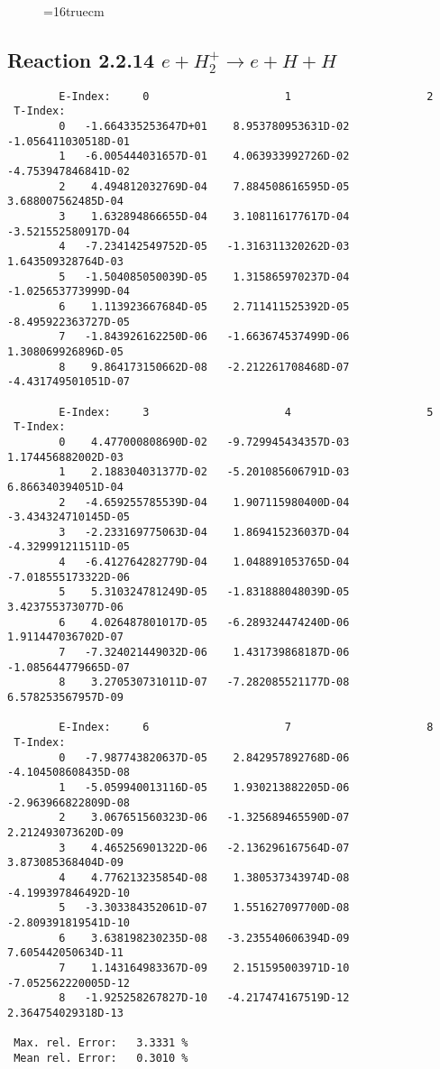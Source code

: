 \documentclass[12pt]{article}
\begin{document}
\begin{figure} \label{2.2.12}
\epsfxsize=16truecm
\end{figure}
\newpage



\subsection{
Reaction 2.2.14  $ e + H_2^+    \rightarrow e + H + H  $
}



\begin{small}\begin{verbatim}
        E-Index:     0                     1                     2
 T-Index:
        0   -1.664335253647D+01    8.953780953631D-02   -1.056411030518D-01
        1   -6.005444031657D-01    4.063933992726D-02   -4.753947846841D-02
        2    4.494812032769D-04    7.884508616595D-05    3.688007562485D-04
        3    1.632894866655D-04    3.108116177617D-04   -3.521552580917D-04
        4   -7.234142549752D-05   -1.316311320262D-03    1.643509328764D-03
        5   -1.504085050039D-05    1.315865970237D-04   -1.025653773999D-04
        6    1.113923667684D-05    2.711411525392D-05   -8.495922363727D-05
        7   -1.843926162250D-06   -1.663674537499D-06    1.308069926896D-05
        8    9.864173150662D-08   -2.212261708468D-07   -4.431749501051D-07

        E-Index:     3                     4                     5
 T-Index:
        0    4.477000808690D-02   -9.729945434357D-03    1.174456882002D-03
        1    2.188304031377D-02   -5.201085606791D-03    6.866340394051D-04
        2   -4.659255785539D-04    1.907115980400D-04   -3.434324710145D-05
        3   -2.233169775063D-04    1.869415236037D-04   -4.329991211511D-05
        4   -6.412764282779D-04    1.048891053765D-04   -7.018555173322D-06
        5    5.310324781249D-05   -1.831888048039D-05    3.423755373077D-06
        6    4.026487801017D-05   -6.289324474240D-06    1.911447036702D-07
        7   -7.324021449032D-06    1.431739868187D-06   -1.085644779665D-07
        8    3.270530731011D-07   -7.282085521177D-08    6.578253567957D-09

        E-Index:     6                     7                     8
 T-Index:
        0   -7.987743820637D-05    2.842957892768D-06   -4.104508608435D-08
        1   -5.059940013116D-05    1.930213882205D-06   -2.963966822809D-08
        2    3.067651560323D-06   -1.325689465590D-07    2.212493073620D-09
        3    4.465256901322D-06   -2.136296167564D-07    3.873085368404D-09
        4    4.776213235854D-08    1.380537343974D-08   -4.199397846492D-10
        5   -3.303384352061D-07    1.551627097700D-08   -2.809391819541D-10
        6    3.638198230235D-08   -3.235540606394D-09    7.605442050634D-11
        7    1.143164983367D-09    2.151595003971D-10   -7.052562220005D-12
        8   -1.925258267827D-10   -4.217474167519D-12    2.364754029318D-13

 Max. rel. Error:   3.3331 %
 Mean rel. Error:   0.3010 %


\end{verbatim}\end{small}
\end{document}

